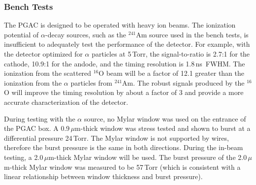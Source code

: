 \subsubsection{Bench Tests}
The PGAC is designed to be operated with heavy ion beams.  The ionization potential of $\alpha$-decay sources, such as the $^{241}$Am source used in the bench tests,  is insufficient to adequately test the performance of the detector.  For example, with the detector optimized for $\alpha$ particles at 5\,Torr, the signal-to-ratio is %
2.7:1  for the cathode, 10.9:1 for the andode,
 and the timing resolution is 1.8\,ns~FWHM.  %
The ionization from the scattered $^{16}$O beam will be a factor of 12.1 greater than the ionization from the $\alpha$ particles from $^{241}$Am. The robust signals produced by the $^{16}$O will improve the timing resolution by about a factor of 3 and provide a more accurate characterization of the detector.

During testing with the $\alpha$ source, no Mylar window was used on the entrance of the PGAC box.  A 0.9\,$\mu$m-thick window was stress tested and shown to burst at a differential pressure 24\,Torr.  The Mylar window is not supported by wires, therefore the burst pressure is the same in both directions.  During the in-beam testing, a  2.0\,$\mu$m-thick Mylar window will be used.  
The burst pressure of the 2.0\,$\mu$m-thick Mylar window was measured to be 57\,Torr (which is consistent with a linear relationship between window thickness and burst pressure).



